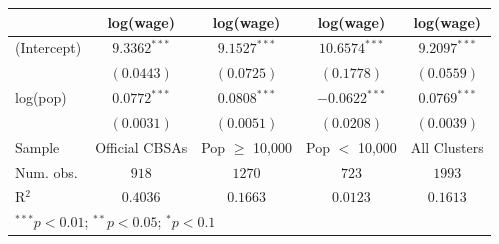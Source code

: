 
\begin{tabular}{l c c c c}
\hline
 & log(wage) & log(wage) & log(wage) & log(wage) \\
\hline
(Intercept) & $9.3362^{***}$ & $9.1527^{***}$    & $10.6574^{***}$ & $9.2097^{***}$ \\
            & $(0.0443)$     & $(0.0725)$        & $(0.1778)$      & $(0.0559)$     \\
log(pop)    & $0.0772^{***}$ & $0.0808^{***}$    & $-0.0622^{***}$ & $0.0769^{***}$ \\
            & $(0.0031)$     & $(0.0051)$        & $(0.0208)$      & $(0.0039)$     \\
\hline
Sample      & Official CBSAs & Pop $\geq$ 10,000 & Pop $<$ 10,000  & All Clusters   \\
Num. obs.   & $918$          & $1270$            & $723$           & $1993$         \\
R$^2$       & $0.4036$       & $0.1663$          & $0.0123$        & $0.1613$       \\
\hline
\multicolumn{5}{l}{\scriptsize{$^{***}p<0.01$; $^{**}p<0.05$; $^{*}p<0.1$}}
\end{tabular}
